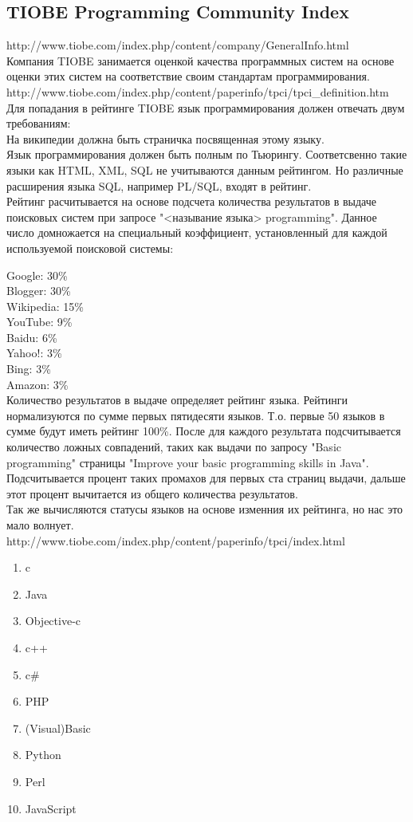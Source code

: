 \subsection{TIOBE Programming Community Index}
http://www.tiobe.com/index.php/content/company/GeneralInfo.html\\
Компания TIOBE занимается оценкой качества программных систем на основе оценки этих систем на соответствие своим стандартам программирования. \\
http://www.tiobe.com/index.php/content/paperinfo/tpci/tpci\_definition.htm\\
Для попадания в рейтинге TIOBE язык программирования должен отвечать двум требованиям:\\
На википедии должна быть страничка посвященная этому языку.\\
Язык программирования должен быть полным по Тьюрингу. Соответсвенно такие языки как HTML, XML, SQL не учитываются данным рейтингом.
Но различные расширения языка SQL, например PL/SQL, входят в рейтинг.\\
Рейтинг расчитывается на основе подсчета количества результатов в выдаче поисковых систем при запросе "<называние языка> programming". 
Данное число домножается на специальный коэффициент, установленный для каждой
 используемой поисковой системы:
 
    Google: 30\%\\
    Blogger: 30\%\\
    Wikipedia: 15\%\\
    YouTube: 9\%\\
    Baidu: 6\%\\
    Yahoo!: 3\%\\
    Bing: 3\%\\
    Amazon: 3\%\\
Количество результатов в выдаче определяет рейтинг языка. Рейтинги нормализуются по сумме первых пятидесяти языков. Т.о. первые 50 языков в сумме будут иметь рейтинг 100\%.
После для каждого результата подсчитывается количество ложных совпадений, таких как выдачи по запросу "Basic programming" страницы "Improve your basic programming skills in Java".
Подсчитывается процент таких промахов для первых ста страниц выдачи, дальше этот процент вычитается из общего количества результатов. \\
Так же вычисляются статусы языков на основе изменния их рейтинга, но нас это мало волнует.\\
http://www.tiobe.com/index.php/content/paperinfo/tpci/index.html
\begin{enumerate}
\item c 
\item Java
\item Objective-c
\item c++
\item c\#
\item PHP
\item (Visual)Basic
\item Python
\item Perl
\item JavaScript
\end{enumerate}
